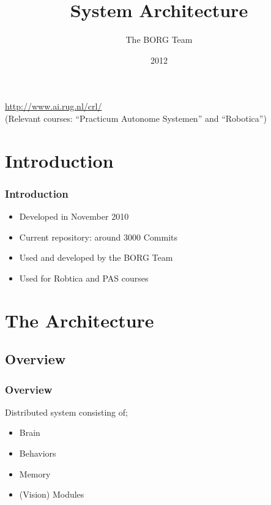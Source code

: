 \documentclass[]{beamer}
\title{System Architecture}
\author{The BORG Team}
\institute{University of Groningen}
\date{2012}
\begin{document}
\begin{frame}
    \titlepage
    \begin{center}
    \tiny{\url{http://www.ai.rug.nl/crl/}} \\
    \tiny{(Relevant courses: ``Practicum Autonome Systemen'' and ``Robotica'')}
    \end{center}
\end{frame}


\section[Outline]{}
\begin{frame}
    \tableofcontents
\end{frame}


\section{Introduction}
\begin{frame}
    \frametitle{Introduction}
    \begin{itemize}
        \item Developed in November 2010
        \item Current repository: around 3000 Commits
        \item Used and developed by the BORG Team
        \item Used for Robtica and PAS courses
    \end{itemize}
\end{frame}


\section{The Architecture}

\subsection{Overview}
\begin{frame}
    \frametitle{Overview}
    Distributed system consisting of;
    \begin{itemize}
        \item Brain
        \item Behaviors
        \item Memory
        \item (Vision) Modules
    \end{itemize}
\end{frame}
\end{document}

